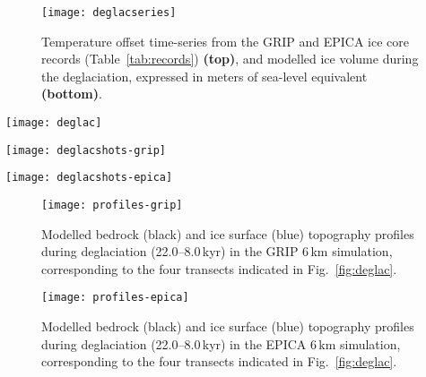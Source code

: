 \documentclass[tc, manuscript]{copernicus}
\begin{document}
\begin{figure}
  \texttt{[image: deglacseries]}
  \caption{Temperature offset time-series from the GRIP and EPICA ice core
           records (Table~\ref{tab:records}) \textbf{(top)}, and modelled ice
           volume during the deglaciation, expressed in meters of sea-level
           equivalent \textbf{(bottom)}.}
  \label{fig:deglacseries}
\end{figure}

\begin{figure*}
  \texttt{[image: deglac]}
  \caption{Modelled age of the last deglaciation. Areas where the MIS~4 glacial
           advance exceeded the last glacial maximum advanced are marked in
           green. Hatches denote re-advance of mountain-centred ice caps and
           and the decaying ice sheet between 14 and 10\,kyr., which is more
           pronounced in the GRIP-driven simulation.}
  \label{fig:deglac}
\end{figure*}

\begin{figure*}
  \texttt{[image: deglacshots-grip]}
  \caption{Snapshots of modelled surface topography (200\,m contours)
           and surface velocity (colour mapping) from the GRIP simulation,
           corresponding to the last glacial ice volume maximum (19.1\,kyr) and
           the last deglaciation.}
  \label{fig:deglacshots-grip}
\end{figure*}

\begin{figure*}
  \texttt{[image: deglacshots-epica]}
  \caption{Snapshots of modelled surface topography (200\,m contours)
           and surface velocity (colour mapping) from the EPICA simulation,
           corresponding to the last glacial ice volume maximum (17.3\,kyr) and
           the last deglaciation.}
  \label{fig:deglacshots-epica}
\end{figure*}


\begin{figure}
  \texttt{[image: profiles-grip]}
  \caption{Modelled bedrock (black) and ice surface (blue) topography profiles
           during deglaciation (22.0--8.0\,kyr) in the GRIP 6\,km
           simulation, corresponding to the four transects indicated in
           Fig.~\ref{fig:deglac}.}
  \label{fig:profiles-grip}
\end{figure}

\begin{figure}
  \texttt{[image: profiles-epica]}
  \caption{Modelled bedrock (black) and ice surface (blue) topography profiles
           during deglaciation (22.0--8.0\,kyr) in the EPICA 6\,km
           simulation, corresponding to the four transects indicated in
           Fig.~\ref{fig:deglac}.}
  \label{fig:profiles-epica}
\end{figure}
\end{document}
